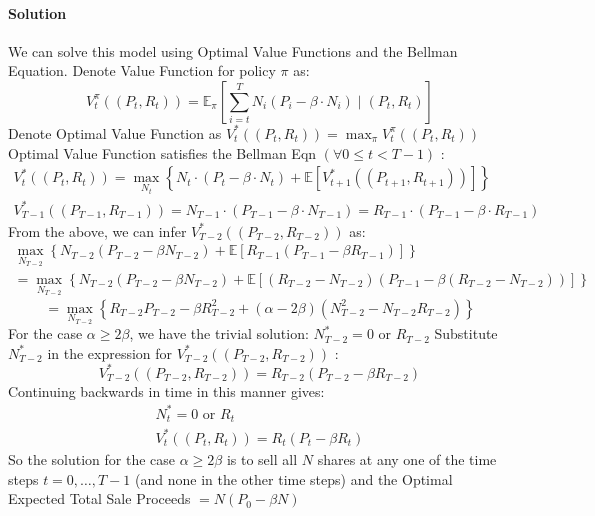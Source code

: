 \documentclass[11pt]{article}
\begin{document}
\paragraph*{Solution}
We can solve this model using Optimal Value Functions and the Bellman Equation. 
Denote Value Function for policy $\pi$ as:
$$
V_t^\pi\left(\left(P_t, R_t\right)\right)=\mathbb{E}_\pi\left[\sum_{i=t}^T N_i\left(P_i-\beta \cdot N_i\right) \mid\left(P_t, R_t\right)\right]
$$
Denote Optimal Value Function as $V_t^*\left(\left(P_t, R_t\right)\right)=\max _\pi V_t^\pi\left(\left(P_t, R_t\right)\right)$
Optimal Value Function satisfies the Bellman Eqn $(\forall 0 \leq t<T-1)$ :
$$
\begin{gathered}
V_t^*\left(\left(P_t, R_t\right)\right)=\max _{N_t}\left\{N_t \cdot\left(P_t-\beta \cdot N_t\right)+\mathbb{E}\left[V_{t+1}^*\left(\left(P_{t+1}, R_{t+1}\right)\right)\right]\right\} \\
V_{T-1}^*\left(\left(P_{T-1}, R_{T-1}\right)\right)=N_{T-1} \cdot\left(P_{T-1}-\beta \cdot N_{T-1}\right)=R_{T-1} \cdot\left(P_{T-1}-\beta \cdot R_{T-1}\right)
\end{gathered}
$$
From the above, we can infer $V_{T-2}^*\left(\left(P_{T-2}, R_{T-2}\right)\right)$ as:
$$
\begin{gathered}
\max _{N_{T-2}}\left\{N_{T-2}\left(P_{T-2}-\beta N_{T-2}\right)+\mathbb{E}\left[R_{T-1}\left(P_{T-1}-\beta R_{T-1}\right)\right]\right\} \\
=\max _{N_{T-2}}\left\{N_{T-2}\left(P_{T-2}-\beta N_{T-2}\right)+\mathbb{E}\left[\left(R_{T-2}-N_{T-2}\right)\left(P_{T-1}-\beta\left(R_{T-2}-N_{T-2}\right)\right)\right]\right\}
\end{gathered}
$$
$$
=\max _{N_{T-2}}\left\{R_{T-2} P_{T-2}-\beta R_{T-2}^2+(\alpha-2 \beta)\left(N_{T-2}^2-N_{T-2} R_{T-2}\right)\right\}
$$
For the case $\alpha \geq 2 \beta$, we have the trivial solution: $N_{T-2}^*=0$ or $R_{T-2}$ Substitute $N_{T-2}^*$ in the expression for $V_{T-2}^*\left(\left(P_{T-2}, R_{T-2}\right)\right)$ :
$$
V_{T-2}^*\left(\left(P_{T-2}, R_{T-2}\right)\right)=R_{T-2}\left(P_{T-2}-\beta R_{T-2}\right)
$$
Continuing backwards in time in this manner gives:
$$
\begin{gathered}
N_t^*=0 \text { or } R_t \\
V_t^*\left(\left(P_t, R_t\right)\right)=R_t\left(P_t-\beta R_t\right)
\end{gathered}
$$
So the solution for the case $\alpha \geq 2 \beta$ is to sell all $N$ shares at any one of the time steps $t=0, \ldots, T-1$ (and none in the other time steps) and the Optimal Expected Total Sale Proceeds $=N\left(P_0-\beta N\right)$
\end{document}

